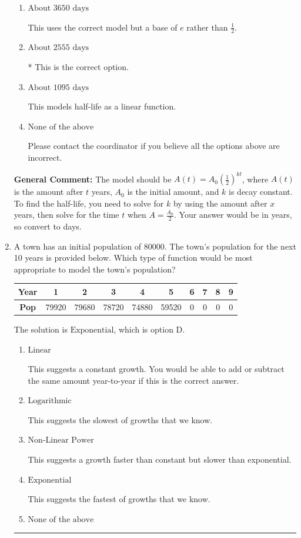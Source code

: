 \documentclass{extbook}[14pt]
\newcommand{\litem}[1]{\item #1

\rule{\textwidth}{0.4pt}}
\begin{document}
\begin{enumerate}
{\begin{enumerate}[label=\Alph*.]
This uses the correct model but solves for the exponential constant incorrectly.
\item \( \text{About } 3650 \text{ days} \)

This uses the correct model but a base of $e$ rather than $\frac{1}{2}$.
\item \( \text{About } 2555 \text{ days} \)

* This is the correct option.
\item \( \text{About } 1095 \text{ days} \)

This models half-life as a linear function.
\item \( \text{None of the above} \)

Please contact the coordinator if you believe all the options above are incorrect.
\end{enumerate}

\textbf{General Comment:} The model should be $A(t) = A_0 (\frac{1}{2})^{kt}$, where $A(t)$ is the amount after $t$ years, $A_0$ is the initial amount, and $k$ is decay constant. To find the half-life, you need to solve for $k$ by using the amount after $x$ years, then solve for the time $t$ when $A = \frac{A_0}{2}$. Your answer would be in years, so convert to days.
}
\litem{
A town has an initial population of 80000. The town's population for the next 10 years is provided below. Which type of function would be most appropriate to model the town's population?


\begin{tabular}{c|c|c|c|c|c|c|c|c|c}
\textbf{Year} &1 &2 &3 &4 &5 &6 &7 &8 &9\tabularnewline \hline
\textbf{Pop} &79920 &79680 &78720 &74880 &59520 &0 &0 &0 &0\end{tabular}The solution is \( \text{Exponential} \), which is option D.\begin{enumerate}[label=\Alph*.]
\item \( \text{Linear} \)

This suggests a constant growth. You would be able to add or subtract the same amount year-to-year if this is the correct answer.
\item \( \text{Logarithmic} \)

This suggests the slowest of growths that we know.
\item \( \text{Non-Linear Power} \)

This suggests a growth faster than constant but slower than exponential.
\item \( \text{Exponential} \)

This suggests the fastest of growths that we know.
\item \( \text{None of the above} \)


\end{enumerate}}
\end{enumerate}
\end{document}
